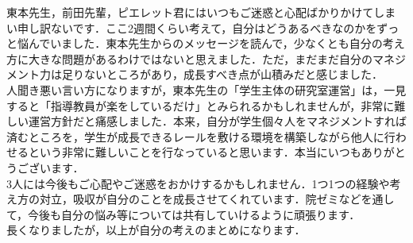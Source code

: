 \documentclass[a4paper,12pt]{ltjsarticle}
\begin{document}
東本先生，前田先輩，ピエレット君にはいつもご迷惑と心配ばかりかけてしまい申し訳ないです．ここ2週間くらい考えて，自分はどうあるべきなのかをずっと悩んでいました．東本先生からのメッセージを読んで，少なくとも自分の考え方に大きな問題があるわけではないと思えました．ただ，まだまだ自分のマネジメント力は足りないところがあり，成長すべき点が山積みだと感じました．\\

人聞き悪い言い方になりますが，東本先生の「学生主体の研究室運営」は，一見すると「指導教員が楽をしているだけ」とみられるかもしれませんが，非常に難しい運営方針だと痛感しました．本来，自分が学生個々人をマネジメントすれば済むところを，学生が成長できるレールを敷ける環境を構築しながら他人に行わせるという非常に難しいことを行なっていると思います．本当にいつもありがとうございます．\\

3人には今後もご心配やご迷惑をおかけするかもしれません．1つ1つの経験や考え方の対立，吸収が自分のことを成長させてくれています．院ゼミなどを通して，今後も自分の悩み等については共有していけるように頑張ります．\\

長くなりましたが，以上が自分の考えのまとめになります．

\end{document}
